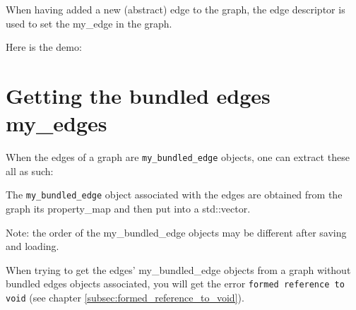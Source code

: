 

When having added a new (abstract) edge to the graph, the edge descriptor
is used to set the my_edge in the graph.

Here is the demo:



\section{Getting the bundled edges my\_edges}
\label{subsec:get_bundled_edge_my_edges}

When the edges of a graph are \verb;my_bundled_edge; objects, 
one can extract these all as such:



The \verb;my_bundled_edge; object associated with the edges are obtained from
the graph its property_map and then put into a std::vector.

Note: the order of the my\_bundled\_edge objects may be different after saving
and loading.

When trying to get the edges' my\_bundled\_edge objects from a graph without
bundled edges objects associated, you will get the error 
\verb;formed reference to void; (see chapter \ref{subsec:formed_reference_to_void}).

